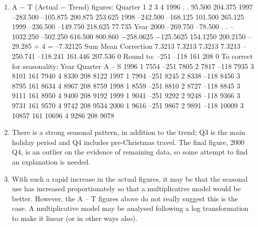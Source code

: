 \documentclass[a4paper,12pt]{article}
\begin{document}
\begin{enumerate} 
\item  A − T (Actual − Trend) figures:
Quarter
1 2 3 4
1996 . . 95.500 204.375
1997 –283.500 –105.875 200.875 253.625
1998 –242.500 –168.125 101.500 265.125
1999 –236.500 –149.750 218.625 77.735
Year
2000 –269.750 –78.500 . .
–1032.250 –502.250 616.500 800.860
−258.0625 −125.5625 154.1250 200.2150 –29.285 ÷ 4 =
–7.32125
Sum
Mean
Correction 7.3213 7.3213 7.3213 7.3213
–250.741 –118.241 161.446 207.536 0
Round to: –251 –118 161 208 0
To correct for seasonality:
Year Quarter A – S
1996 1 7554 –251 7805
2 7817 –118 7935
3 8101 161 7940
4 8330 208 8122
1997 1 7994 –251 8245
2 8338 –118 8456
3 8795 161 8634
4 8967 208 8759
1998 1 8559 –251 8810
2 8727 –118 8845
3 9111 161 8950
4 9400 208 9192
1999 1 9041 –251 9292
2 9248 –118 9366
3 9731 161 9570
4 9742 208 9534
2000 1 9616 –251 9867
2 9891 –118 10009
3 10857 161 10696
4 9286 208 9078
\item  There is a strong seasonal pattern, in addition to the trend; Q3 is the main
holiday period and Q4 includes pre-Christmas travel. The final figure, 2000 Q4, is an
outlier on the evidence of remaining data, so some attempt to find an explanation is
needed.
\item  With such a rapid increase in the actual figures, it may be that the seasonal use
has increased proportionately so that a multiplicative model would be better.
However, the A – T figures above do not really suggest this is the case. A
multiplicative model may be analysed following a log transformation to make it linear
(or in other ways also).

\end{enumerate}
\end{document}
